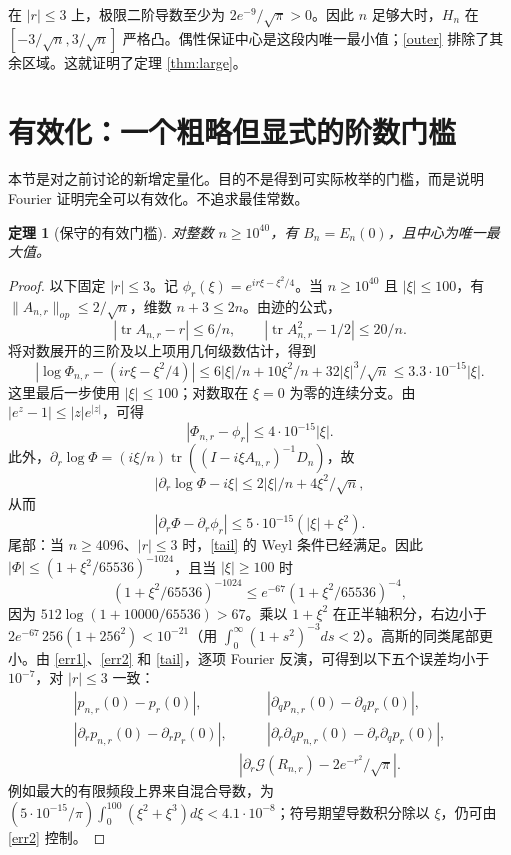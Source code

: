 \documentclass[11pt,a4paper,fontset=fandol]{ctexart}
\newcommand{\tr}{\operatorname{tr}}
\newcommand{\G}{\mathcal G}
\newtheorem{theorem}{定理}
\theoremstyle{remark}\newtheorem{conjecture}{猜想}
\begin{document}
在 $|r|\le3$ 上，极限二阶导数至少为 $2e^{-9}/\sqrt\pi>0$。因此 $n$ 足够大时，$H_n$ 在 $[-3/\sqrt n,3/\sqrt n]$ 严格凸。偶性保证中心是这段内唯一最小值；\eqref{outer} 排除了其余区域。这就证明了定理 \ref{thm:large}。

\section{有效化：一个粗略但显式的阶数门槛}\label{sec:effective}
本节是对之前讨论的新增定量化。目的不是得到可实际枚举的门槛，而是说明 Fourier 证明完全可以有效化。不追求最佳常数。
\begin{theorem}[保守的有效门槛]
对整数 $n\ge 10^{40}$，有 $B_n=E_n(0)$，且中心为唯一最大值。
\end{theorem}
\begin{proof}
以下固定 $|r|\le3$。记 $\phi_r(\xi)=e^{ir\xi-\xi^2/4}$。当 $n\ge10^{40}$ 且 $|\xi|\le100$，有 $\|A_{n,r}\|_{op}\le2/\sqrt n$，维数 $n+3\le2n$。由迹的公式，
\[
 |\tr A_{n,r}-r|\le6/n,\qquad |\tr A_{n,r}^2-1/2|\le20/n.
\]
将对数展开的三阶及以上项用几何级数估计，得到
\[
 |\log\Phi_{n,r}-(ir\xi-\xi^2/4)|
 \le6|\xi|/n+10\xi^2/n+32|\xi|^3/\sqrt n
 \le3.3\cdot10^{-15}|\xi|.
\]
这里最后一步使用 $|\xi|\le100$；对数取在 $\xi=0$ 为零的连续分支。由 $|e^z-1|\le |z|e^{|z|}$，可得
\begin{equation}\label{err1}
 |\Phi_{n,r}-\phi_r|\le4\cdot10^{-15}|\xi|.
\end{equation}
此外，$\partial_r\log\Phi=(i\xi/n)\tr((I-i\xi A_{n,r})^{-1}D_n)$，故
\[
 |\partial_r\log\Phi-i\xi|\le2|\xi|/n+4\xi^2/\sqrt n,
\]
从而
\begin{equation}\label{err2}
 |\partial_r\Phi-\partial_r\phi_r|\le5\cdot10^{-15}(|\xi|+\xi^2).
\end{equation}
尾部：当 $n\ge4096$、$|r|\le3$ 时，\eqref{tail} 的 Weyl 条件已经满足。因此 $|\Phi|\le(1+\xi^2/65536)^{-1024}$，且当 $|\xi|\ge100$ 时
\[
 (1+\xi^2/65536)^{-1024}
 \le e^{-67}(1+\xi^2/65536)^{-4},
\]
因为 $512\log(1+10000/65536)>67$。乘以 $1+\xi^2$ 在正半轴积分，右边小于 $2e^{-67}\,256(1+256^2)<10^{-21}$（用 $\int_0^\infty(1+s^2)^{-3}ds<2$）。高斯的同类尾部更小。由 \eqref{err1}、\eqref{err2} 和 \eqref{tail}，逐项 Fourier 反演，可得到以下五个误差均小于 $10^{-7}$，对 $|r|\le3$ 一致：
\begin{align*}
 |p_{n,r}(0)-p_r(0)|,&\qquad |\partial_qp_{n,r}(0)-\partial_qp_r(0)|,\\
 |\partial_rp_{n,r}(0)-\partial_rp_r(0)|,&\qquad |\partial_r\partial_qp_{n,r}(0)-\partial_r\partial_qp_r(0)|,\\
 &|\partial_r\G(R_{n,r})-2e^{-r^2}/\sqrt\pi|.
\end{align*}
例如最大的有限频段上界来自混合导数，为 $(5\cdot10^{-15}/\pi)\int_0^{100}(\xi^2+\xi^3)d\xi<4.1\cdot10^{-8}$；符号期望导数积分除以 $\xi$，仍可由 \eqref{err2} 控制。


\end{proof}
\end{document}

